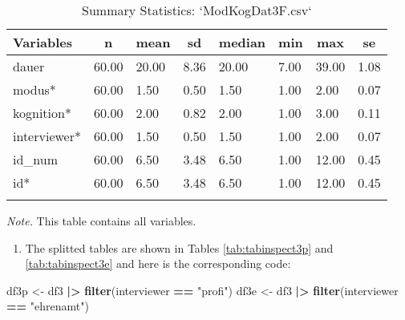 \documentclass[
  doc,floatsintext]{apa6}
\newenvironment{Shaded}{\begin{snugshade}}{\end{snugshade}}
\newcommand{\FunctionTok}[1]{\textcolor[rgb]{0.13,0.29,0.53}{\textbf{#1}}}
\newcommand{\NormalTok}[1]{#1}
\newcommand{\OtherTok}[1]{\textcolor[rgb]{0.56,0.35,0.01}{#1}}
\newcommand{\SpecialCharTok}[1]{\textcolor[rgb]{0.81,0.36,0.00}{\textbf{#1}}}
\newcommand{\StringTok}[1]{\textcolor[rgb]{0.31,0.60,0.02}{#1}}
\providecommand{\tightlist}{%
  \setlength{\itemsep}{0pt}\setlength{\parskip}{0pt}}
\begin{document}
\begin{table}[tbp]

\begin{center}
\begin{threeparttable}

\caption{\label{tab:tabsumstat3correct}Summary Statistics: `ModKogDat3F.csv`}

\begin{tabular}{llllllll}
\toprule
Variables & \multicolumn{1}{c}{n} & \multicolumn{1}{c}{mean} & \multicolumn{1}{c}{sd} & \multicolumn{1}{c}{median} & \multicolumn{1}{c}{min} & \multicolumn{1}{c}{max} & \multicolumn{1}{c}{se}\\
\midrule
dauer & 60.00 & 20.00 & 8.36 & 20.00 & 7.00 & 39.00 & 1.08\\
modus* & 60.00 & 1.50 & 0.50 & 1.50 & 1.00 & 2.00 & 0.07\\
kognition* & 60.00 & 2.00 & 0.82 & 2.00 & 1.00 & 3.00 & 0.11\\
interviewer* & 60.00 & 1.50 & 0.50 & 1.50 & 1.00 & 2.00 & 0.07\\
id\_num & 60.00 & 6.50 & 3.48 & 6.50 & 1.00 & 12.00 & 0.45\\
id* & 60.00 & 6.50 & 3.48 & 6.50 & 1.00 & 12.00 & 0.45\\
\bottomrule
\addlinespace
\end{tabular}

\begin{tablenotes}[para]
\normalsize{\textit{Note.} This table contains all variables.}
\end{tablenotes}

\end{threeparttable}
\end{center}

\end{table}

\begin{enumerate}
\def\labelenumi{\arabic{enumi}.}
\setcounter{enumi}{1}
\tightlist
\item
  The splitted tables are shown in Tables \ref{tab:tabinspect3p} and \ref{tab:tabinspect3e} and here is the corresponding code:
\end{enumerate}

\begin{Shaded}
\begin{Highlighting}[]
\NormalTok{df3p }\OtherTok{\textless{}{-}}\NormalTok{ df3 }\SpecialCharTok{|\textgreater{}} 
  \FunctionTok{filter}\NormalTok{(interviewer }\SpecialCharTok{==} \StringTok{"profi"}\NormalTok{)}
\NormalTok{df3e }\OtherTok{\textless{}{-}}\NormalTok{ df3 }\SpecialCharTok{|\textgreater{}} 
  \FunctionTok{filter}\NormalTok{(interviewer }\SpecialCharTok{==} \StringTok{"ehrenamt"}\NormalTok{)}
\end{Highlighting}
\end{Shaded}
\end{document}
